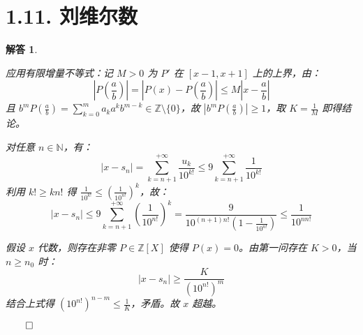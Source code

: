 \documentclass[12pt,UTF8]{ctexbook}
\theoremstyle{exercisestyle}
\theoremstyle{solutionstyle}
\newtheorem*{solution*}{解答}
\newenvironment{solution}
  {\begin{solution*}}
  {\hfill\ensuremath{\qed}\end{solution*}}
\begin{document}
\section{1.11. 刘维尔数}
\begin{solution}
\begin{subquestions}
\item 应用有限增量不等式：记 $M > 0$ 为 $P'$ 在 $[x-1, x+1]$ 上的上界，由：
$$
\left| P\left(\frac{a}{b}\right) \right| = \left| P(x) - P\left(\frac{a}{b}\right) \right| \leq M \left| x - \frac{a}{b} \right|
$$
且 $b^m P\left(\frac{a}{b}\right) = \sum_{k=0}^m a_k a^k b^{m-k} \in \mathbb{Z} \setminus \{0\}$，故 $\left|b^m P\left(\frac{a}{b}\right)\right| \geq 1$，取 $K = \frac{1}{M}$ 即得结论。

\item 对任意 $n \in \mathbb{N}$，有：
$$
|x - s_n| = \sum_{k=n+1}^{+\infty} \frac{u_k}{10^{k!}} \leq 9 \sum_{k=n+1}^{+\infty} \frac{1}{10^{k!}}
$$
利用 $k! \geq kn!$ 得 $\frac{1}{10^{k!}} \leq \left(\frac{1}{10^{n!}}\right)^k$，故：
$$
|x - s_n| \leq 9 \sum_{k=n+1}^{+\infty} \left(\frac{1}{10^{n!}}\right)^k = \frac{9}{10^{(n+1)n!}(1 - \frac{1}{10^{n!}})} \leq \frac{1}{10^{nn!}}
$$

假设 $x$ 代数，则存在非零 $P \in \mathbb{Z}[X]$ 使得 $P(x)=0$。由第一问存在 $K>0$，当 $n \geq n_0$ 时：
$$
|x - s_n| \geq \frac{K}{(10^{n!})^m}
$$
结合上式得 $(10^{n!})^{n-m} \leq \frac{1}{K}$，矛盾。故 $x$ 超越。

\end{subquestions}
\end{solution}
\end{document}

